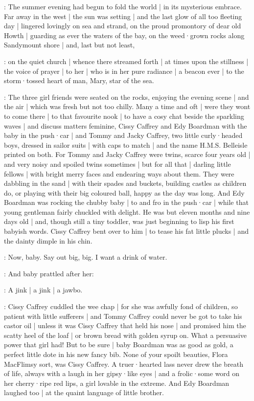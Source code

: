 \Nnovel:
The summer evening
had begun to fold the world |
in its mysterious embrace.
Far away in the west |
the sun was setting |
and the last glow of all too fleeting day |
lingered lovingly on sea and strand,
on the proud promontory
of dear old Howth |
guarding as ever
the waters of the bay,
on the weed·grown rocks along Sandymount shore |
and,
last but not least,

\Nrelig:
on the quiet church |
whence there streamed forth |
at times upon the stillness |
the voice of prayer |
to her |
who is in her pure radiance |
a beacon ever |
to the storm·tossed heart of man,
Mary,
star of the sea.

\Nnovel:
The three girl friends were seated on the rocks,
enjoying the evening scene |
and the air |
which was fresh but not too chilly.%
Many a time and oft |
were they wont to come there |
to that favourite nook |
to have a cosy chat
beside the sparkling waves |
and discuss matters feminine,
Cissy Caffrey
and Edy Boardman with the baby in the push·car |
and Tommy and Jacky Caffrey,
two little curly·headed boys,
dressed in sailor suits |
with caps to match |
and the name H.M.S. Belleisle printed on both.
For Tommy and Jacky Caffrey were twins,
scarce four years old |
and very noisy and spoiled twins sometimes |
but for all that |
darling little fellows |
with bright merry faces and endearing ways about them.
They were dabbling in the sand |
with their spades and buckets,
building castles as children do,
or playing with their big coloured ball,
happy as the day was long.%
And Edy Boardman was rocking the chubby baby |
to and fro in the push·car |
while that young gentleman
fairly chuckled with delight.
He was but eleven months and nine days old |
and,
though still a tiny toddler,
was just beginning to lisp his first babyish words.
Cissy Caffrey bent over to him |
to tease his fat little plucks |
and the dainty dimple in his chin.

\cissy:
Now,
baby.
Say out big,
big.
I want a drink of water.

:
And baby prattled after her:

\baby:
A jink |
a jink |
a jawbo.

:
Cissy Caffrey cuddled the wee chap |
for she was awfully fond of children,
so patient with little sufferers |%
and Tommy Caffrey could never be got to take his castor oil |
unless it was Cissy Caffrey that held his nose |
and promised him the scatty heel of the loaf |
or brown bread with golden syrup on.
What a persuasive power that girl had!
But to be sure |
baby Boardman was as good as gold,
a perfect little dote in his new fancy bib.
None of your spoilt beauties,
Flora MacFlimsy sort,
was Cissy Caffrey.
A truer·hearted lass never drew the breath of life,
always with a laugh in her gipsy·like eyes |
and a frolic·some word on her cherry·ripe red lips,
a girl lovable in the extreme.
And Edy Boardman laughed too |
at the quaint language of little brother.

